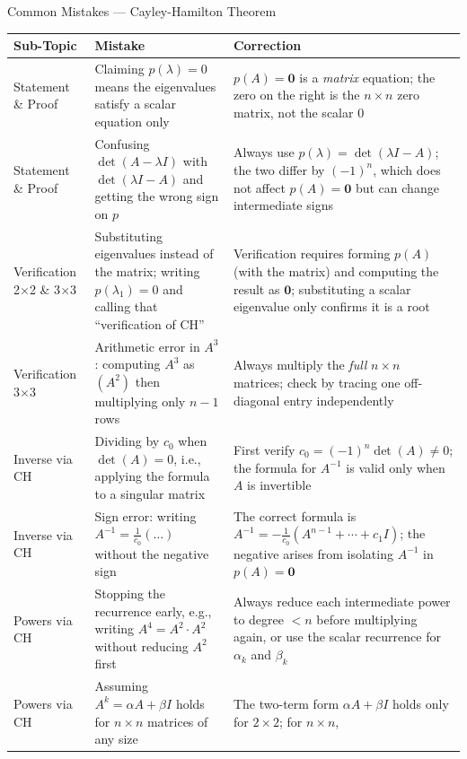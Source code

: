 \documentclass[12pt,a4paper]{article}
\begin{document}
\begin{mistakebox}{Common Mistakes --- Cayley-Hamilton Theorem}
\begin{tabular}{@{}p{3.2cm} p{5.4cm} p{6cm}@{}}
\toprule
\textbf{Sub-Topic} & \textbf{Mistake} & \textbf{Correction} \\
\midrule
Statement \& Proof &
Claiming $p(\lambda)=0$ means the eigenvalues satisfy a scalar equation only &
$p(A)=\mathbf{0}$ is a \emph{matrix} equation; the zero on the right is the
$n\times n$ zero matrix, not the scalar 0 \\
\addlinespace
Statement \& Proof &
Confusing $\det(A-\lambda I)$ with $\det(\lambda I - A)$ and getting the wrong sign on $p$ &
Always use $p(\lambda)=\det(\lambda I - A)$; the two differ by $(-1)^{n}$,
which does not affect $p(A)=\mathbf{0}$ but can change intermediate signs \\
\addlinespace
Verification 2\(\times\)2 \& 3\(\times\)3 &
Substituting eigenvalues instead of the matrix; writing $p(\lambda_{1})=0$
and calling that ``verification of CH'' &
Verification requires forming $p(A)$ (with the matrix) and computing the result as
$\mathbf{0}$; substituting a scalar eigenvalue only confirms it is a root \\
\addlinespace
Verification 3\(\times\)3 &
Arithmetic error in $A^{3}$: computing $A^{3}$ as $(A^{2})$ then multiplying
only $n-1$ rows &
Always multiply the \emph{full} $n\times n$ matrices; check by tracing one off-diagonal entry independently \\
\addlinespace
Inverse via CH &
Dividing by $c_{0}$ when $\det(A)=0$, i.e., applying the formula to a singular matrix &
First verify $c_{0}=(-1)^{n}\det(A)\neq 0$; the formula for $A^{-1}$ is valid
only when $A$ is invertible \\
\addlinespace
Inverse via CH &
Sign error: writing $A^{-1}=\tfrac{1}{c_0}(\ldots)$ without the negative sign &
The correct formula is $A^{-1}=-\tfrac{1}{c_0}(A^{n-1}+\cdots+c_1 I)$;
the negative arises from isolating $A^{-1}$ in $p(A)=\mathbf{0}$ \\
\addlinespace
Powers via CH &
Stopping the recurrence early, e.g., writing $A^{4}=A^{2}\cdot A^{2}$ without
reducing $A^{2}$ first &
Always reduce each intermediate power to degree $< n$ before multiplying again,
or use the scalar recurrence for $\alpha_k$ and $\beta_k$ \\
\addlinespace
Powers via CH &
Assuming $A^{k}=\alpha A + \beta I$ holds for $n\times n$ matrices of any size &
The two-term form $\alpha A+\beta I$ holds only for $2\times2$; for $n\times n$,

\end{tabular}
\end{mistakebox}
\end{document}
